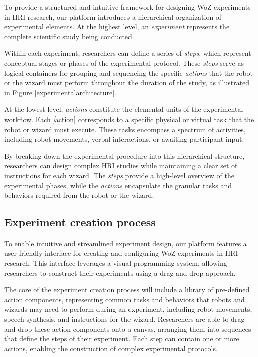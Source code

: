 \documentclass[letterpaper, 10 pt, conference]{ieeeconf}
\begin{document}
To provide a structured and intuitive framework for designing WoZ experiments in HRI research, our platform introduces a hierarchical organization of experimental elements. At the highest level, an \textit{experiment} represents the complete scientific study being conducted.

Within each experiment, researchers can define a series of \textit{steps}, which represent conceptual stages or phases of the experimental protocol. These \textit{steps} serve as logical containers for grouping and sequencing the specific \textit{actions} that the robot or the wizard must perform throughout the duration of the study, as illustrated in Figure \ref{experimentalarchitecture}.

At the lowest level, \textit{actions} constitute the elemental units of the experimental workflow. Each \textit[action] corresponds to a specific physical or virtual task that the robot or wizard must execute. These tasks encompass a spectrum of activities, including robot movements, verbal interactions, or awaiting participant input.

By breaking down the experimental procedure into this hierarchical structure, researchers can design complex HRI studies while maintaining a clear set of instructions for each wizard. The \textit{steps} provide a high-level overview of the experimental phases, while the \textit{actions} encapsulate the granular tasks and behaviors required from the robot or the wizard.

\subsection{Experiment creation process}

To enable intuitive and streamlined experiment design, our platform features a user-friendly interface for creating and configuring WoZ experiments in HRI research. This interface leverages a visual programming system, allowing researchers to construct their experiments using a drag-and-drop approach.

The core of the experiment creation process will include a library of pre-defined action components, representing common tasks and behaviors that robots and wizards may need to perform during an experiment, including robot movements, speech synthesis, and instructions for the wizard. Researchers are able to drag and drop these action components onto a canvas, arranging them into sequences that define the steps of their experiment. Each step can contain one or more actions, enabling the construction of complex experimental protocols.
\end{document}
